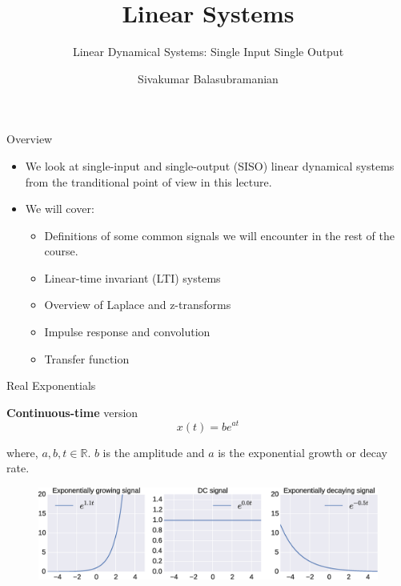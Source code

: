 \documentclass[aspectratio=169]{beamer}
\title{Linear Systems}
\subtitle{Linear Dynamical Systems: Single Input Single Output}
\author{Sivakumar Balasubramanian}
\institute[Christian Medical College] %
{
  \inst{}%
  Department of Bioengineering\\
  Christian Medical College, Bagayam\\
  Vellore 632002
}
\date{}
\begin{document}

\begin{frame}
  \titlepage
\end{frame}

\begin{frame}{Overview}
\begin{itemize}
    \item We look at single-input and single-output (SISO) linear dynamical systems from the tranditional point of view in this lecture.
    \item We will cover: 
    \begin{itemize}
        \item Definitions of some common signals we will encounter in the rest of the course.
        \item Linear-time invariant (LTI) systems
        \item Overview of Laplace and z-transforms
        \item Impulse response and convolution
        \item Transfer function
    \end{itemize} 
\end{itemize}
\end{frame}

\begin{frame}{Real Exponentials}

\textbf{Continuous-time} version
\[ x(t) = be^{at} \]

where, $a, b, t \in \mathbb{R}$. $b$ is the amplitude and $a$ is the exponential growth or decay rate.

\begin{figure}
\includegraphics[width=\textwidth]{img/exp.eps}
\end{figure}
\end{frame}
\end{document}
